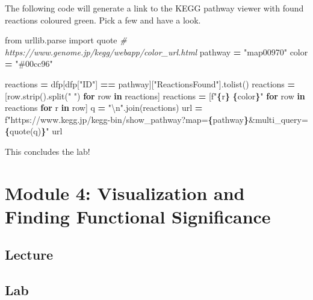 \documentclass[
]{book}
\newenvironment{Shaded}{\begin{snugshade}}{\end{snugshade}}
\newcommand{\CharTok}[1]{\textcolor[rgb]{0.31,0.60,0.02}{#1}}
\newcommand{\CommentTok}[1]{\textcolor[rgb]{0.56,0.35,0.01}{\textit{#1}}}
\newcommand{\ControlFlowTok}[1]{\textcolor[rgb]{0.13,0.29,0.53}{\textbf{#1}}}
\newcommand{\ImportTok}[1]{#1}
\newcommand{\KeywordTok}[1]{\textcolor[rgb]{0.13,0.29,0.53}{\textbf{#1}}}
\newcommand{\NormalTok}[1]{#1}
\newcommand{\OperatorTok}[1]{\textcolor[rgb]{0.81,0.36,0.00}{\textbf{#1}}}
\newcommand{\SpecialCharTok}[1]{\textcolor[rgb]{0.81,0.36,0.00}{\textbf{#1}}}
\newcommand{\SpecialStringTok}[1]{\textcolor[rgb]{0.31,0.60,0.02}{#1}}
\newcommand{\StringTok}[1]{\textcolor[rgb]{0.31,0.60,0.02}{#1}}
\begin{document}
The following code will generate a link to the KEGG pathway viewer with found reactions coloured green.
Pick a few and have a look.

\begin{Shaded}
\begin{Highlighting}[numbers=left,,]
\ImportTok{from}\NormalTok{ urllib.parse }\ImportTok{import}\NormalTok{ quote}
\CommentTok{\# https://www.genome.jp/kegg/webapp/color\_url.html}
\NormalTok{pathway }\OperatorTok{=} \StringTok{"map00970"}
\NormalTok{color }\OperatorTok{=} \StringTok{"\#00cc96"}

\NormalTok{reactions }\OperatorTok{=}\NormalTok{ dfp[dfp[}\StringTok{"ID"}\NormalTok{] }\OperatorTok{==}\NormalTok{ pathway][}\StringTok{"ReactionsFound"}\NormalTok{].tolist()}
\NormalTok{reactions }\OperatorTok{=}\NormalTok{ [row.strip().split(}\StringTok{" "}\NormalTok{) }\ControlFlowTok{for}\NormalTok{ row }\KeywordTok{in}\NormalTok{ reactions]}
\NormalTok{reactions }\OperatorTok{=}\NormalTok{ [}\SpecialStringTok{f"}\SpecialCharTok{\{}\NormalTok{r}\SpecialCharTok{\}}\SpecialStringTok{ }\SpecialCharTok{\{}\NormalTok{color}\SpecialCharTok{\}}\SpecialStringTok{"} \ControlFlowTok{for}\NormalTok{ row }\KeywordTok{in}\NormalTok{ reactions }\ControlFlowTok{for}\NormalTok{ r }\KeywordTok{in}\NormalTok{ row]}
\NormalTok{q }\OperatorTok{=} \StringTok{"}\CharTok{\textbackslash{}n}\StringTok{"}\NormalTok{.join(reactions)}
\NormalTok{url }\OperatorTok{=} \SpecialStringTok{f"https://www.kegg.jp/kegg{-}bin/show\_pathway?map=}\SpecialCharTok{\{}\NormalTok{pathway}\SpecialCharTok{\}}\SpecialStringTok{\&multi\_query=}\SpecialCharTok{\{}\NormalTok{quote(q)}\SpecialCharTok{\}}\SpecialStringTok{"}
\NormalTok{url}
\end{Highlighting}
\end{Shaded}

This concludes the lab!

\chapter{Module 4: Visualization and Finding Functional Significance}\label{module-4-visualization-and-finding-functional-significance}

\section{Lecture}\label{lecture-3}

\section{Lab}\label{lab-2}
\end{document}
